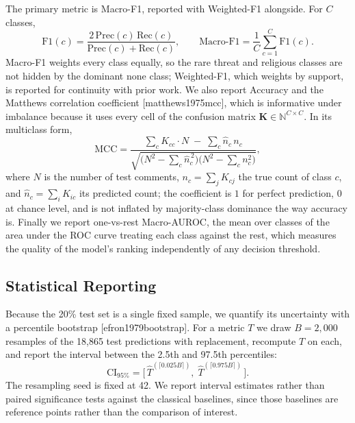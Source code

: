 \documentclass[11pt,a4paper]{article}
\def\citep#1{[#1]}%
\def\emph#1{#1}%
\begin{document}
The primary metric is Macro-F1, reported with Weighted-F1 alongside. For $C$ classes,
\begin{equation}
\mathrm{F1}(c) = \frac{2\,\mathrm{Prec}(c)\,\mathrm{Rec}(c)}{\mathrm{Prec}(c) + \mathrm{Rec}(c)},
\qquad
\text{Macro-F1} = \frac{1}{C}\sum_{c=1}^{C} \mathrm{F1}(c).
\label{eq:macrof1}
\end{equation}
Macro-F1 weights every class equally, so the rare \emph{threat} and \emph{religious} classes are not hidden by the dominant \emph{none} class; Weighted-F1, which weights by support, is reported for continuity with prior work. We also report Accuracy and the Matthews correlation coefficient \citep{matthews1975mcc}, which is informative under imbalance because it uses every cell of the confusion matrix $\mathbf{K} \in \mathbb{N}^{C \times C}$. In its multiclass form,
\begin{equation}
\mathrm{MCC} =
\frac{\sum_{c} K_{cc} \cdot N \;-\; \sum_{c} \hat{n}_c\, n_c}
{\sqrt{\big(N^2 - \sum_{c} \hat{n}_c^{\,2}\big)\big(N^2 - \sum_{c} n_c^{2}\big)}},
\label{eq:mcc}
\end{equation}
where $N$ is the number of test comments, $n_c = \sum_{j} K_{cj}$ the true count of class $c$, and $\hat{n}_c = \sum_{i} K_{ic}$ its predicted count; the coefficient is $1$ for perfect prediction, $0$ at chance level, and is not inflated by majority-class dominance the way accuracy is. Finally we report one-vs-rest Macro-AUROC, the mean over classes of the area under the ROC curve treating each class against the rest, which measures the quality of the model's ranking independently of any decision threshold.

\subsection{Statistical Reporting}
\label{sec:stats}

Because the 20\% test set is a single fixed sample, we quantify its uncertainty with a percentile bootstrap \citep{efron1979bootstrap}. For a metric $T$ we draw $B = 2{,}000$ resamples of the 18{,}865 test predictions with replacement, recompute $T$ on each, and report the interval between the 2.5th and 97.5th percentiles:
\begin{equation}
\mathrm{CI}_{95\%} = \big[\, \hat{T}^{(\lceil 0.025 B \rceil)},\; \hat{T}^{(\lceil 0.975 B \rceil)} \,\big].
\label{eq:bootstrap}
\end{equation}
The resampling seed is fixed at 42. We report interval estimates rather than paired significance tests against the classical baselines, since those baselines are reference points rather than the comparison of interest.
\end{document}

